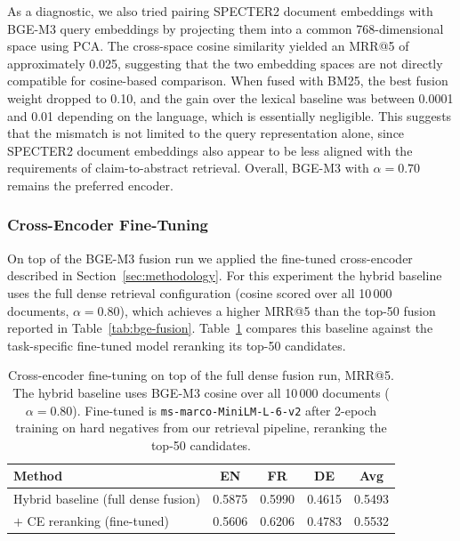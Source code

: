 As a diagnostic, we also tried pairing SPECTER2 document embeddings with BGE-M3 query embeddings by projecting them into a common 768-dimensional space using PCA. The cross-space cosine similarity yielded an MRR@5 of approximately 0.025, suggesting that the two embedding spaces are not directly compatible for cosine-based comparison. When fused with BM25, the best fusion weight dropped to 0.10, and the gain over the lexical baseline was between 0.0001 and 0.01 depending on the language, which is essentially negligible. This suggests that the mismatch is not limited to the query representation alone, since SPECTER2 document embeddings also appear to be less aligned with the requirements of claim-to-abstract retrieval. Overall, BGE-M3 with $\alpha=0.70$ remains the preferred encoder.

\subsubsection{Cross-Encoder Fine-Tuning}
\label{subsubsec:res-ce}

On top of the BGE-M3 fusion run we applied the fine-tuned cross-encoder described in Section~\ref{sec:methodology}. For this experiment the hybrid baseline uses the full dense retrieval configuration (cosine scored over all 10\,000 documents, $\alpha{=}0.80$), which achieves a higher MRR@5 than the top-50 fusion reported in Table~\ref{tab:bge-fusion}. Table~\ref{tab:ce-finetune} compares this baseline against the task-specific fine-tuned model reranking its top-50 candidates.

\begin{table}[!ht]
    \caption{Cross-encoder fine-tuning on top of the full dense fusion run, MRR@5. The hybrid baseline uses BGE-M3 cosine over all 10\,000 documents ($\alpha{=}0.80$). Fine-tuned is \texttt{ms-marco-MiniLM-L-6-v2} after 2-epoch training on hard negatives from our retrieval pipeline, reranking the top-50 candidates.}
    \label{tab:ce-finetune}
    \centering
    \begin{tabular}{lcccc}
        \toprule
        Method & EN & FR & DE & Avg \\
        \midrule
        Hybrid baseline (full dense fusion) & 0.5875 & 0.5990 & 0.4615 & 0.5493 \\
        $+$ CE reranking (fine-tuned)       & 0.5606 & 0.6206 & 0.4783 & 0.5532 \\
        \bottomrule
    \end{tabular}
\end{table}

